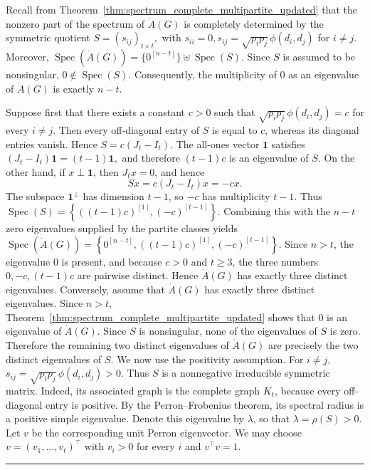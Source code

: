 \documentclass[12pt,twoside]{article}
\renewenvironment{proof}{{\noindent\bfseries Proof.}}{\qed}
\newcommand{\spec}{\operatorname{Spec}}
\def\qed{\nolinebreak\hfill\rule{.2cm}{.2cm}\par\addvspace{.5cm}}
\begin{document}
\begin{proof}
	Recall from Theorem~\ref{thm:spectrum_complete_multipartite_updated} that the nonzero part of the spectrum of $\dot A(G)$ is completely determined by the symmetric quotient
	$
	S=(s_{ij})_{t\times t},$ with $
	s_{ii}=0, 
	s_{ij}=\sqrt{p_ip_j}\,\phi(d_i,d_j)
	$ for $i\neq j.$
	Moreover,
	$
	\spec(\dot A(G))
	=
	\{0^{[n-t]}\}\uplus\spec(S).
	$
	Since $S$ is assumed to be nonsingular, $0\notin\spec(S)$. Consequently, the multiplicity of $0$ as an eigenvalue of $\dot A(G)$ is exactly $n-t$. 
	
	Suppose first that there exists a constant $c>0$ such that
	$
	\sqrt{p_ip_j}\,\phi(d_i,d_j)=c
	$
	for every $i\neq j$. Then every off-diagonal entry of $S$ is equal to $c$, whereas its diagonal entries vanish. Hence
	$
	S=c(J_t-I_t).
	$
	The all-ones vector $\mathbf 1$ satisfies
	$
	(J_t-I_t)\mathbf 1=(t-1)\mathbf 1,
	$
	and therefore $(t-1)c$ is an eigenvalue of $S$. On the other hand, if $x\perp\mathbf 1$, then $J_tx=0$, and hence
	$$
	Sx
	=
	c(J_t-I_t)x
	= 
	-cx.
	$$
	The subspace $\mathbf 1^{\perp}$ has dimension $t-1$, so $-c$ has multiplicity $t-1$. Thus
	$
	\spec(S)
	=
	\left\{
		((t-1)c)^{[1]},
		(-c)^{[t-1]}
		\right\}.
	$
	Combining this with the $n-t$ zero eigenvalues supplied by the partite classes yields
	$
	\spec(\dot A(G))
	=
	\left\{
		0^{[n-t]},
		((t-1)c)^{[1]},
		(-c)^{[t-1]}
		\right\}.
	$
	Since $n>t$, the eigenvalue $0$ is present, and because $c>0$ and $t\geq3$, the three numbers
	$
	0, -c, (t-1)c
	$
	are pairwise distinct. Hence $\dot A(G)$ has exactly three distinct eigenvalues. 
	Conversely, assume that $\dot A(G)$ has exactly three distinct eigenvalues. Since $n>t$, Theorem~\ref{thm:spectrum_complete_multipartite_updated} shows that $0$ is an eigenvalue of $\dot A(G)$. Since $S$ is nonsingular, none of the eigenvalues of $S$ is zero. Therefore the remaining two distinct eigenvalues of $\dot A(G)$ are precisely the two distinct eigenvalues of $S$. We now use the positivity assumption. For $i\neq j$,
	$
	s_{ij}
	=
	\sqrt{p_ip_j}\,\phi(d_i,d_j)>0.
	$
	Thus $S$ is a nonnegative irreducible symmetric matrix. Indeed, its associated graph is the complete graph $K_t$, because every off-diagonal entry is positive. By the Perron--Frobenius theorem, its spectral radius is a positive simple eigenvalue. Denote this eigenvalue by $\lambda$, so that
	$
	\lambda=\rho(S)>0.
	$
	Let $v$ be the corresponding unit Perron eigenvector. We may choose
	$
	v=(v_1,\ldots,v_t)^{\top}
	$
	with
	$
	v_i>0
	$
	for every $i$ and
	$
	v^{\top}v=1.
	$
	

\end{proof}
\end{document}
